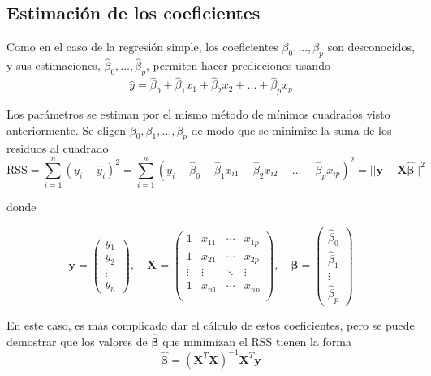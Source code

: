 \subsection{Estimación de los coeficientes}

Como en el caso de la regresión simple, los coeficientes $\beta_0, \dots, \beta_p$ son desconocidos, y sus estimaciones, $\hat{\beta}_0, \dots, \hat{\beta}_p$, permiten hacer predicciones usando 
\begin{equation}
\hat{y} = \hat{\beta}_0 + \hat{\beta}_1 x_1 + \hat{\beta}_2 x_2 + \dots + \hat{\beta}_p x_p
\label{eq:3.21}
\end{equation}

Los parámetros se estiman por el mismo método de mínimos cuadrados visto anteriormente. Se eligen $\beta_0, \beta_1, \dots, \beta_p$ de modo que se minimize la suma de los residuos al cuadrado
\begin{equation}
\text{RSS} = \sum_{i=1}^n (y_i - \hat{y}_i)^2 = \sum_{i=1}^n (y_i - \hat{\beta}_0 - \hat{\beta}_1 x_{i1} - \hat{\beta}_2 x_{i2} - \dots - \hat{\beta}_p x_{ip})^2 = ||\mathbf{y} - \mathbf{X}\boldsymbol{\hat{\beta}}||^2
\end{equation}

\noindent donde 

\begin{equation}
\mathbf{y} = 
\begin{pmatrix}
y_1 \\
y_2 \\
\vdots \\
y_n
\end{pmatrix}, \quad \mathbf{X} = 
\begin{pmatrix}
1 & x_{11} & \cdots & x_{1p} \\
1 & x_{21} & \cdots & x_{2p} \\
\vdots & \vdots & \ddots & \vdots \\
1 & x_{n1} & \cdots & x_{np} \\
\end{pmatrix}, \quad \boldsymbol{\hat{\beta}} = 
\begin{pmatrix}
\hat{\beta}_0 \\
\hat{\beta}_1 \\
\vdots \\
\hat{\beta}_p
\end{pmatrix}
\end{equation}

En este caso, es más complicado dar el cálculo de estos coeficientes, pero se puede demostrar que los valores de $\boldsymbol{\hat{\beta}}$ que minimizan el RSS tienen la forma 
\begin{equation}
\boldsymbol{\hat{\beta}} = (\mathbf{X}^T\mathbf{X})^{-1} \mathbf{X}^T \mathbf{y}
\end{equation}


